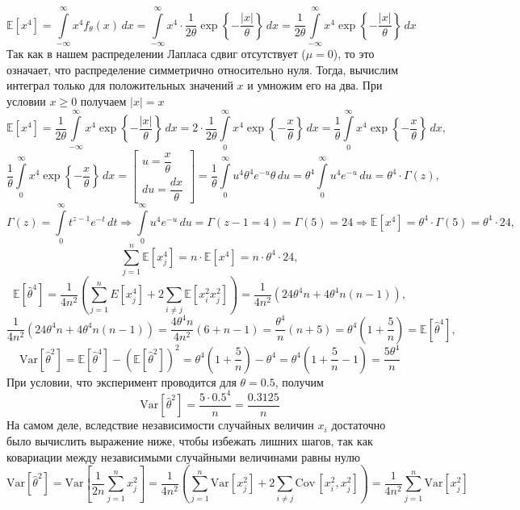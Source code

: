 \documentclass[a4paper, 12pt]{article}
\begin{document}
    $$\mathbb{E}\left[x^4\right]=\int\limits_{-\infty}^{\infty}x^4f_{\theta}(x)\,dx=\int\limits_{-\infty}^{\infty}x^4\cdot\dfrac{1}{2\theta}\exp{\left\{-\dfrac{|x|}{\theta}\right\}}\,dx=\dfrac{1}{2\theta}\int\limits_{-\infty}^{\infty}x^4\exp{\left\{-\dfrac{|x|}{\theta}\right\}}\,dx$$
    Так как в нашем распределении Лапласа сдвиг отсутствует ($\mu=0$), то это означает, что распределение симметрично относительно нуля. Тогда, вычислим интеграл только для
    положительных значений $x$ и умножим его на два. При условии $x\geq0$ получаем $|x|=x$
    $$\mathbb{E}\left[x^4\right]=\dfrac{1}{2\theta}\int\limits_{-\infty}^{\infty}x^4\exp{\left\{-\dfrac{|x|}{\theta}\right\}}\,dx=2\cdot\dfrac{1}{2\theta}\int\limits_{0}^{\infty}x^4\exp{\left\{-\dfrac{x}{\theta}\right\}}\,dx=
    \dfrac{1}{\theta}\int\limits_{0}^{\infty}x^4\exp{\left\{-\dfrac{x}{\theta}\right\}}\,dx,$$
    $$\dfrac{1}{\theta}\int\limits_{0}^{\infty}x^4\exp{\left\{-\dfrac{x}{\theta}\right\}}\,dx=
    \begin{bmatrix}
        u=\dfrac{x}{\theta}\\
        du=\dfrac{dx}{\theta}
    \end{bmatrix}=
    \dfrac{1}{\theta}\int\limits_{0}^{\infty}u^4\theta^4e^{-u}\theta\,du=\theta^4\int\limits_{0}^{\infty}u^4e^{-u}\,du=\theta^4\cdot\Gamma{(z)},$$
    $$\Gamma{(z)}=\int\limits_{0}^{\infty}t^{z-1}e^{-t}\,dt\Rightarrow\int\limits_{0}^{\infty}u^4e^{-u}\,du=\Gamma{(z-1=4)}=\Gamma{(5)}=24\Rightarrow\mathbb{E}\left[x^4\right]=\theta^4\cdot\Gamma{(5)}=\theta^4\cdot24,$$
    $$\sum\limits_{j=1}^{n}\mathbb{E}\left[x_j^4\right]=n\cdot\mathbb{E}\left[x^4\right]=n\cdot\theta^4\cdot24,$$
    $$\mathbb{E}\left[\hat{\theta}^4\right]=\dfrac{1}{4n^2}\left(\sum\limits_{j=1}^{n}E\left[x_j^4\right]+2\sum\limits_{i\neq{j}}\mathbb{E}\left[x_i^2x_j^2\right]\right)=
    \dfrac{1}{4n^2}\left(24\theta^4n+4\theta^4n\left(n-1\right)\right),$$
    $$\dfrac{1}{4n^2}\left(24\theta^4n+4\theta^4n\left(n-1\right)\right)=\dfrac{4\theta^4n}{4n^2}\left(6+n-1\right)=\dfrac{\theta^4}{n}\left(n+5\right)=\theta^4\left(1+\dfrac{5}{n}\right)=\mathbb{E}\left[\hat{\theta}^4\right],$$
    $$\text{Var}{\left[\hat{\theta}^2\right]}=\mathbb{E}\left[\hat{\theta}^4\right]-\left(\mathbb{E}\left[\hat{\theta}^2\right]\right)^2=
    \theta^4\left(1+\dfrac{5}{n}\right)-\theta^4=\theta^4\left(1+\dfrac{5}{n}-1\right)=\dfrac{5\theta^4}{n}$$
    При условии, что эксперимент проводится для $\theta=0.5$, получим
    $$\text{Var}{\left[\hat{\theta}^2\right]}=\dfrac{5\cdot0.5^4}{n}=\dfrac{0.3125}{n}$$
    На самом деле, вследствие независимости случайных величин $x_i$ достаточно было вычислить выражение ниже, чтобы избежать лишних шагов, так как ковариации между независимыми случайными величинами равны нулю
    $$\text{Var}{\left[\hat{\theta}^2\right]}=\text{Var}{\left[\dfrac{1}{2n}\sum\limits_{j=1}^{n}x_j^2\right]}=\dfrac{1}{4n^2}\left(\sum\limits_{j=1}^{n}\text{Var}\left[x_{j}^2\right]+2\sum\limits_{i\neq{j}}\text{Cov}\,\left[x_i^2,x_j^2\right]\right)=\dfrac{1}{4n^2}\sum\limits_{j=1}^{n}\text{Var}\left[x_{j}^2\right]$$
\end{document}
